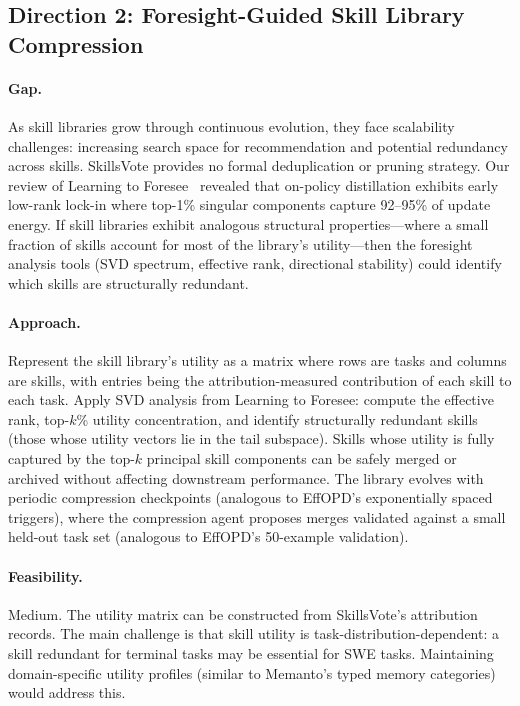 \documentclass[11pt,a4paper]{article}
\begin{document}
\subsection{Direction 2: Foresight-Guided Skill Library Compression}

\paragraph{Gap.} As skill libraries grow through continuous evolution, they face scalability challenges: increasing search space for recommendation and potential redundancy across skills. SkillsVote provides no formal deduplication or pruning strategy. Our review of Learning to Foresee~\cite{foresee} revealed that on-policy distillation exhibits early low-rank lock-in where top-1\% singular components capture 92--95\% of update energy. If skill libraries exhibit analogous structural properties---where a small fraction of skills account for most of the library's utility---then the foresight analysis tools (SVD spectrum, effective rank, directional stability) could identify which skills are structurally redundant.

\paragraph{Approach.} Represent the skill library's utility as a matrix where rows are tasks and columns are skills, with entries being the attribution-measured contribution of each skill to each task. Apply SVD analysis from Learning to Foresee: compute the effective rank, top-$k$\% utility concentration, and identify structurally redundant skills (those whose utility vectors lie in the tail subspace). Skills whose utility is fully captured by the top-$k$ principal skill components can be safely merged or archived without affecting downstream performance. The library evolves with periodic compression checkpoints (analogous to EffOPD's exponentially spaced triggers), where the compression agent proposes merges validated against a small held-out task set (analogous to EffOPD's 50-example validation).

\paragraph{Feasibility.} Medium. The utility matrix can be constructed from SkillsVote's attribution records. The main challenge is that skill utility is task-distribution-dependent: a skill redundant for terminal tasks may be essential for SWE tasks. Maintaining domain-specific utility profiles (similar to Memanto's typed memory categories) would address this.
\end{document}
